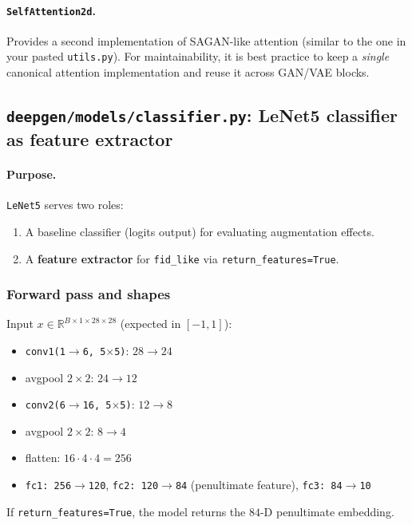 \paragraph{\texttt{SelfAttention2d}.}
Provides a second implementation of SAGAN-like attention (similar to the one in your pasted \texttt{utils.py}). For maintainability, it is best practice to keep a \emph{single} canonical attention implementation and reuse it across GAN/VAE blocks.

\subsection{\texttt{deepgen/models/classifier.py}: LeNet5 classifier as feature extractor}
\label{subsec:code_classifier}

\paragraph{Purpose.}
\texttt{LeNet5} serves two roles:
\begin{enumerate}
  \item A baseline classifier (logits output) for evaluating augmentation effects.
  \item A \textbf{feature extractor} for \texttt{fid\_like} via \texttt{return\_features=True}.
\end{enumerate}

\subsubsection*{Forward pass and shapes}
Input \(x\in\mathbb{R}^{B\times 1\times 28\times 28}\) (expected in \([-1,1]\)):
\begin{itemize}
  \item \texttt{conv1(1$\rightarrow$6, 5$\times$5)}: \(28\rightarrow 24\)
  \item avgpool \(2\times 2\): \(24\rightarrow 12\)
  \item \texttt{conv2(6$\rightarrow$16, 5$\times$5)}: \(12\rightarrow 8\)
  \item avgpool \(2\times 2\): \(8\rightarrow 4\)
  \item flatten: \(16\cdot 4\cdot 4=256\)
  \item \texttt{fc1: 256$\rightarrow$120}, \texttt{fc2: 120$\rightarrow$84} (penultimate feature), \texttt{fc3: 84$\rightarrow$10}
\end{itemize}
If \texttt{return\_features=True}, the model returns the \(84\)-D penultimate embedding.

